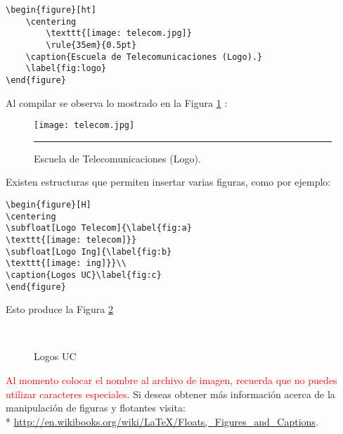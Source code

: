 \begin{lstlisting}[frame=single]
\begin{figure}[ht]
	\centering
		\texttt{[image: telecom.jpg]}
		\rule{35em}{0.5pt}
	\caption{Escuela de Telecomunicaciones (Logo).}
	\label{fig:logo}
\end{figure} 
\end{lstlisting}

Al compilar se observa lo mostrado en la Figura \ref{fig:logo} :

\begin{figure}[ht]
	\centering
		\texttt{[image: telecom.jpg]}
		\rule{35em}{0.5pt}
	\caption{Escuela de Telecomunicaciones (Logo).}
	\label{fig:logo}
\end{figure} 

\newpage
Existen estructuras que permiten insertar varias figuras, como por ejemplo:

\begin{lstlisting}[frame=single]
\begin{figure}[H] 
\centering 
\subfloat[Logo Telecom]{\label{fig:a} 
\texttt{[image: telecom]}} 
\subfloat[Logo Ing]{\label{fig:b} 
\texttt{[image: ing]}}\\ 
\caption{Logos UC}\label{fig:c} 
\end{figure} 
\end{lstlisting}

Esto produce la Figura \ref{fig:c}

\begin{figure}[H]
\centering 
{} 
\\ 
\caption{Logos UC}\label{fig:c} 
\end{figure} 

\noindent \textcolor{red}{Al momento colocar el nombre al archivo de imagen, recuerda que no puedes utilizar caracteres especiales}. Si deseas obtener más información acerca de la manipulación de figuras y flotantes visita: \\*
\url{http://en.wikibooks.org/wiki/LaTeX/Floats,_Figures_and_Captions}.

